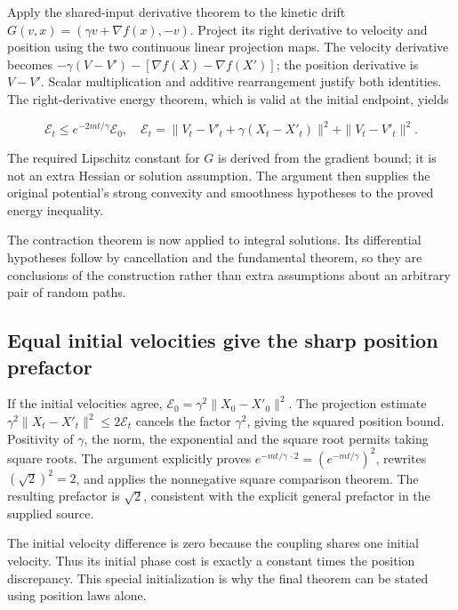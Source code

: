 \documentclass[11pt,a4paper]{report}
\begin{document}
Apply the shared-input derivative theorem to the kinetic drift \(G(v,x)=(\gamma v+\nabla f(x),-v)\). Project its right derivative to velocity and position using the two continuous linear projection maps. The velocity derivative becomes \(-\gamma(V-V\prime)-[\nabla f(X)-\nabla f(X\prime)]\); the position derivative is \(V-V\prime\). Scalar multiplication and additive rearrangement justify both identities. The right-derivative energy theorem, which is valid at the initial endpoint, yields

\[\mathcal E_t\le e^{-2mt/\gamma}\mathcal E_0,\quad\mathcal E_t=\|V_t-V\prime_t+\gamma(X_t-X\prime_t)\|^2+\|V_t-V\prime_t\|^2.\]

The required Lipschitz constant for \(G\) is derived from the gradient bound; it is not an extra Hessian or solution assumption. The argument then supplies the original potential's strong convexity and smoothness hypotheses to the proved energy inequality.



The contraction theorem is now applied to integral solutions. Its differential hypotheses follow by cancellation and the fundamental theorem, so they are conclusions of the construction rather than extra assumptions about an arbitrary pair of random paths.

\subsection{\texorpdfstring{Equal initial velocities give the sharp position prefactor}{Equal initial velocities give the sharp position prefactor}}
\label{report-step-KineticLangevin-SynchronousFlow-lean-2}


If the initial velocities agree, \(\mathcal E_0=\gamma^2\|X_0-X\prime_0\|^2\). The projection estimate \(\gamma^2\|X_t-X\prime_t\|^2\le2\mathcal E_t\) cancels the factor \(\gamma^2\), giving the squared position bound. Positivity of \(\gamma\), the norm, the exponential and the square root permits taking square roots. The argument explicitly proves \(e^{-mt/\gamma\,\cdot2}=(e^{-mt/\gamma})^2\), rewrites \((\sqrt2)^2=2\), and applies the nonnegative square comparison theorem. The resulting prefactor is \(\sqrt2\), consistent with the explicit general prefactor in the supplied source.



The initial velocity difference is zero because the coupling shares one initial velocity. Thus its initial phase cost is exactly a constant times the position discrepancy. This special initialization is why the final theorem can be stated using position laws alone.
\end{document}
